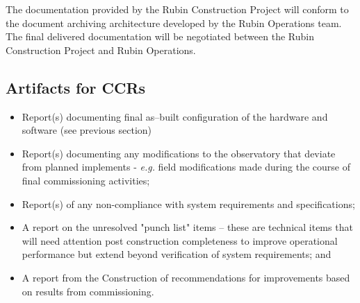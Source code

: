 \begin{itemize}
The documentation provided by the Rubin Construction Project will conform to the document archiving architecture developed by the Rubin Operations team.  The final delivered documentation will be negotiated between the Rubin Construction Project and Rubin Operations.

\subsection{Artifacts for CCRs}

\begin{itemize}

	\item Report(s) documenting final as--built configuration of the hardware and software (see previous section)
	\item Report(s) documenting any modifications to the observatory that deviate from planned implements - {\it e.g.} field modifications made during the course of final commissioning activities;
	\item Report(s) of any non-compliance with system requirements and specifications;
	\item A report on the unresolved "punch list" items -- these are technical items that will need attention post construction completeness to improve operational performance but extend beyond verification of system requirements; and
	\item A report from the Construction of recommendations for improvements based on results from commissioning.
\end{itemize}
	
\end{itemize}
